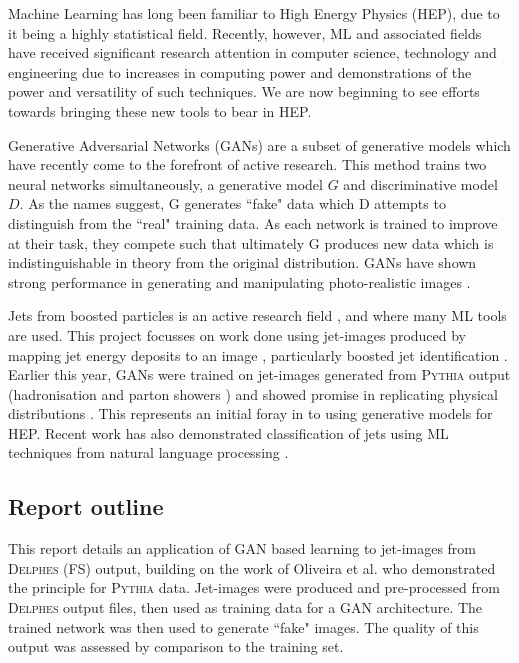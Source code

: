 \documentclass[twocolumn,twoside]{article}
\newcommand{\pkg}[1]{\textsc{#1}}
\begin{document}
Machine Learning has long been familiar to High Energy Physics (HEP), due to it being a highly statistical field. Recently, however, ML and associated fields have received significant research attention in computer science, technology and engineering due to increases in computing power and demonstrations of the power and versatility of such techniques. We are now beginning to see efforts towards bringing these new tools to bear in HEP.

Generative Adversarial Networks (GANs) \cite{gan1} are a subset of generative models which have recently come to the forefront of active research. This method trains two neural networks simultaneously, a generative model $G$ and discriminative model $D$. As the names suggest, G generates ``fake" data which D attempts to distinguish from the ``real" training data. As each network is trained to improve at their task, they compete such that ultimately G produces new data which is indistinguishable in theory from the original distribution. GANs have shown strong performance in generating and manipulating photo-realistic images \cite{Radford2015,odena2016conditional,learnww,text2im,GoodfellowNips}.

Jets from boosted particles is an active research field \cite{BOOST}, and where many ML tools are used.  This project focusses on work done using jet-images produced by mapping jet energy deposits to an image \cite{cogan2014jet,de2015jet}, particularly boosted jet identification \cite{Komiske:2016rsd,Almeida:2015jua,Baldi:2016fql}. Earlier this year, GANs were trained on jet-images generated from \pkg{Pythia} output (hadronisation and parton showers \cite{pythia}) and showed promise in replicating physical distributions \cite{de2017learning}. This represents an initial foray in to using generative models for HEP. Recent work has also demonstrated classification of jets using ML techniques from natural language processing \cite{louppe2017qcd}.

\subsection{Report outline}

This report details an application of GAN based learning to jet-images from \pkg{Delphes} (FS) output, building on the work of Oliveira et al. \cite{de2017learning} who demonstrated the principle for \pkg{Pythia} data. Jet-images were produced and pre-processed from \pkg{Delphes} output files, then used as training data for a GAN architecture. The trained network was then used to generate ``fake" images. The quality of this output was assessed by comparison to the training set. 
\end{document}
